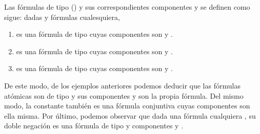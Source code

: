 \begin{isabellebody}
\begin{isamarkuptext}
  \begin{definicion}
    Las fórmulas de tipo \isa{{\isasymalpha}} () y sus correspondientes componentes
     y  se definen como sigue: dadas  y  fórmulas cualesquiera,
    \begin{enumerate}
      \item {} es una fórmula de tipo \isa{{\isasymalpha}} cuyas componentes son  y .
      \item {} es una fórmula de tipo \isa{{\isasymalpha}} cuyas componentes son  y .
      \item {} es una fórmula de tipo \isa{{\isasymalpha}} cuyas componentes son  y .
    \end{enumerate} 
  \end{definicion}

  De este modo, de los ejemplos anteriores podemos deducir que las fórmulas atómicas son de tipo \isa{{\isasymalpha}}
  y sus componentes  y  son la propia fórmula. Del mismo modo, la constante \isa{{\isasymbottom}} también es 
  una fórmula conjuntiva cuyas componentes son ella misma. Por último, podemos observar que dada
  una fórmula cualquiera , su doble negación  es una fórmula de tipo \isa{{\isasymalpha}} y componentes
   y .


\end{isamarkuptext}
\end{isabellebody}
